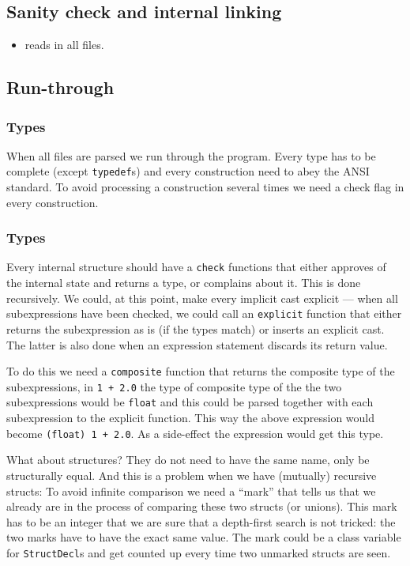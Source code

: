 \begin{docpart}
\begin{itemize}
\end{itemize}

\subsection{Sanity check and internal linking}
\begin{itemize}
\item \cmix reads in all files. 
    
\end{itemize}

\subsection{Run-through}
\subsubsection{Types}
When all files are parsed we run through the program. Every type has
to be complete (except \texttt{typedef}s) and every construction need
to abey the ANSI standard. To avoid processing a construction several
times we need a check flag in every construction.

\subsubsection{Types}
Every internal structure should have a \texttt{check} functions that
either approves of the internal state and returns a type, or complains
about it. This is done recursively. We could, at this point, make
every implicit cast explicit --- when all subexpressions have been
checked, we could call an \texttt{explicit} function that either
returns the subexpression as is (if the types match) or inserts an
explicit cast. The latter is also done when an expression statement
discards its return value.

To do this we need a \texttt{composite} function that returns the
composite type of the subexpressions, \eg in \texttt{1 + 2.0} the type
of composite type of the the two subexpressions would be
\texttt{float} and this could be parsed together with each
subexpression to the explicit function. This way the above expression
would become \texttt{(float) 1 + 2.0}. As a side-effect the expression
would get this type.

What about structures? They do not need to have the same name, only be
structurally equal. And this is a problem when we have (mutually)
recursive structs: To avoid infinite comparison we need a ``mark''
that tells us that we already are in the process of comparing these
two structs (or unions). This mark has to be an integer that we are
sure that a depth-first search is not tricked: the two marks have to
have the exact same value. The mark could be a class variable for
\texttt{StructDecl}s and get counted up every time two unmarked
structs are seen.


\end{docpart}
